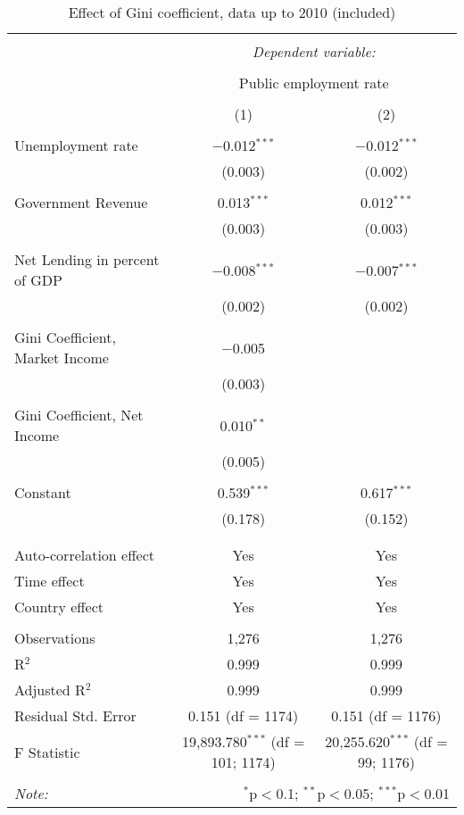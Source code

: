 
\begin{table}[!htbp] \centering 
  \caption{Effect of Gini coefficient, data up to 2010 (included)} 
  \label{} 
\begin{tabular}{@{\extracolsep{5pt}}lcc} 
\\[-1.8ex]\hline 
\hline \\[-1.8ex] 
 & \multicolumn{2}{c}{\textit{Dependent variable:}} \\ 
\cline{2-3} 
\\[-1.8ex] & \multicolumn{2}{c}{Public employment rate} \\ 
\\[-1.8ex] & (1) & (2)\\ 
\hline \\[-1.8ex] 
 Unemployment rate & $-$0.012$^{***}$ & $-$0.012$^{***}$ \\ 
  & (0.003) & (0.002) \\ 
  & & \\ 
 Government Revenue & 0.013$^{***}$ & 0.012$^{***}$ \\ 
  & (0.003) & (0.003) \\ 
  & & \\ 
 Net Lending in percent of GDP & $-$0.008$^{***}$ & $-$0.007$^{***}$ \\ 
  & (0.002) & (0.002) \\ 
  & & \\ 
 Gini Coefficient, Market Income & $-$0.005 &  \\ 
  & (0.003) &  \\ 
  & & \\ 
 Gini Coefficient, Net Income & 0.010$^{**}$ &  \\ 
  & (0.005) &  \\ 
  & & \\ 
 Constant & 0.539$^{***}$ & 0.617$^{***}$ \\ 
  & (0.178) & (0.152) \\ 
  & & \\ 
\hline \\[-1.8ex] 
Auto-correlation effect & Yes & Yes \\ 
Time effect & Yes & Yes \\ 
Country effect & Yes & Yes \\ 
\hline \\[-1.8ex] 
Observations & 1,276 & 1,276 \\ 
R$^{2}$ & 0.999 & 0.999 \\ 
Adjusted R$^{2}$ & 0.999 & 0.999 \\ 
Residual Std. Error & 0.151 (df = 1174) & 0.151 (df = 1176) \\ 
F Statistic & 19,893.780$^{***}$ (df = 101; 1174) & 20,255.620$^{***}$ (df = 99; 1176) \\ 
\hline 
\hline \\[-1.8ex] 
\textit{Note:}  & \multicolumn{2}{r}{$^{*}$p$<$0.1; $^{**}$p$<$0.05; $^{***}$p$<$0.01} \\ 
\end{tabular} 
\end{table} 
